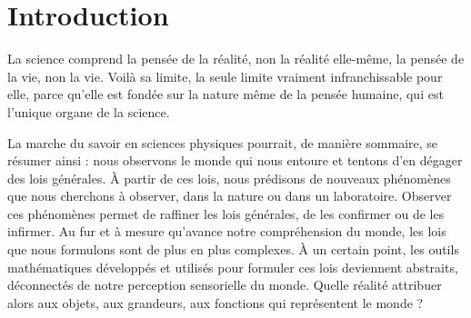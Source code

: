 \chapter*{Introduction}\label{chapter:intro}
 \mtcaddchapter
{}
\begin{fquote}
La science comprend la pensée de la réalité, non la réalité elle-même, la pensée de la vie, non la vie. Voilà sa limite, la seule limite vraiment infranchissable pour elle, parce qu'elle est fondée sur la nature même de la pensée humaine, qui est l'unique organe de la science.
\end{fquote}


La marche du savoir en sciences physiques pourrait, de manière sommaire, se résumer ainsi :
nous observons le monde qui nous entoure et tentons d'en dégager des lois générales.
À partir de ces lois, nous prédisons de nouveaux phénomènes que nous cherchons à observer, dans la nature ou dans un laboratoire.
Observer ces phénomènes permet de raffiner les lois générales, de les confirmer ou de les infirmer.
Au fur et à mesure qu'avance notre compréhension du monde, les lois que nous formulons sont de plus en plus complexes.
\`A un certain point, les outils mathématiques développés et utilisés pour formuler ces lois deviennent abstraits, déconnectés de notre perception sensorielle du monde.
Quelle \og réalité \fg{} attribuer alors aux objets, aux grandeurs, aux fonctions qui représentent le monde ?

